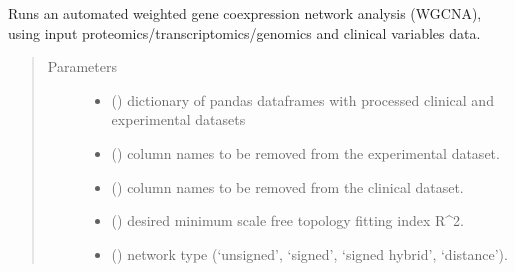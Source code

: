 \documentclass[letterpaper,10pt,english]{sphinxmanual}
\begin{document}
\begin{fulllineitems}
\label{\detokenize{_autosummary/analytics_core.analytics:analytics_core.analytics.analytics.run_WGCNA}}
Runs an automated weighted gene co\sphinxhyphen{}expression network analysis (WGCNA), using input proteomics/transcriptomics/genomics and clinical variables data.
\begin{quote}\begin{description}
\item[{Parameters}] \leavevmode\begin{itemize}
\item {} 
 () \textendash{} dictionary of pandas dataframes with processed clinical and experimental datasets

\item {} 
 () \textendash{} column names to be removed from the experimental dataset.

\item {} 
 () \textendash{} column names to be removed from the clinical dataset.

\item {} 
 () \textendash{} desired minimum scale free topology fitting index R\textasciicircum{}2.

\item {} 
 () \textendash{} network type (‘unsigned’, ‘signed’, ‘signed hybrid’, ‘distance’).


\end{itemize}
\end{description}
\end{quote}
\end{fulllineitems}
\end{document}
